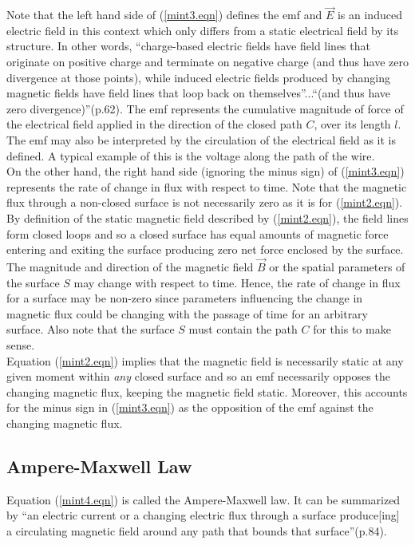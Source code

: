 \documentclass[12pt]{article}
\theoremstyle{definition}
\numberwithin{equation}{section}
\begin{document}
Note that the left hand side of (\ref{mint3.eqn}) defines the emf and $\vec{E}$ is an induced electric field in this context which only differs from a static electrical field by its structure. In other words, \enquote{charge-based electric fields have field lines that originate on positive charge and terminate on negative charge (and thus have zero divergence at those points), while induced electric fields produced by changing magnetic fields have field lines that loop back on themselves}...\enquote{(and thus have zero divergence)}(p.62)\cite{Flei}. The emf represents the cumulative magnitude of force of the electrical field applied in the direction of the closed path $C$, over its length $l$. The emf may also be interpreted by the circulation of the electrical field as it is defined. A typical example of this is the voltage along the path of the wire.\\

On the other hand, the right hand side (ignoring the minus sign) of (\ref{mint3.eqn}) represents the rate of change in flux with respect to time. Note that the magnetic flux through a non-closed surface is not necessarily zero as it is for (\ref{mint2.eqn}). By definition of the static magnetic field described by (\ref{mint2.eqn}), the field lines form closed loops and so a closed surface has equal amounts of magnetic force entering and exiting the surface producing zero net force enclosed by the surface. The magnitude and direction of the magnetic field $\vec{B}$ or the spatial parameters of the surface $S$ may change with respect to time. Hence, the rate of change in flux for a surface may be non-zero since parameters influencing the change in magnetic flux could be changing with the passage of time for an arbitrary surface. Also note that the surface $S$ must contain the path $C$ for this to make sense.\\

Equation (\ref{mint2.eqn}) implies that the magnetic field is necessarily static at any given moment within {\it any} closed surface and so an emf necessarily opposes the changing magnetic flux, keeping the magnetic field static. Moreover, this accounts for the minus sign in (\ref{mint3.eqn}) as the opposition of the emf against the changing magnetic flux.

\subsection{Ampere-Maxwell Law}

Equation (\ref{mint4.eqn}) is called the Ampere-Maxwell law. It can be summarized by \enquote{an electric current or a changing electric flux through a surface produce[ing] a circulating magnetic field around any path that bounds that surface}(p.84)\cite{Flei}.\\
\end{document}
